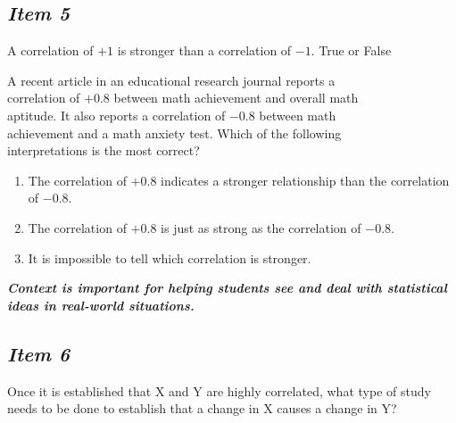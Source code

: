 \documentclass[twoside,openany]{tufte-book}
\begin{document}
\newpage

\subsection{\textbf{\textit{Item 5}}}
A correlation of $+1$ is stronger than a correlation of $-1$. True or False\\
\vspace{8pt}

\noindent{}

A recent article in an educational research journal reports a \\ correlation of  $+0.8$ between math achievement and overall math \\ aptitude. It also reports a correlation of  $-0.8$ between math\\ achievement and a math anxiety test. Which of the following\\ interpretations is the most correct?
\begin{enumerate} [leftmargin=2cm, itemsep=.2em]
\item The correlation of $+0.8$ indicates a stronger relationship than the correlation of $-0.8$.
\item The correlation of $+0.8$ is just as strong as the correlation of $-0.8$.
\item It is impossible to tell which correlation is stronger.
\end{enumerate}

\noindent \textbf{\textit{Context is important for helping students see and deal with statistical ideas in real-world situations.}}

\subsection{\textbf{\textit{Item 6}}}
Once it is established that X and Y are highly correlated, what type of study needs to be done to establish that a change in X causes a change in Y?\\

\vspace{8pt}
\noindent{}
\end{document}
